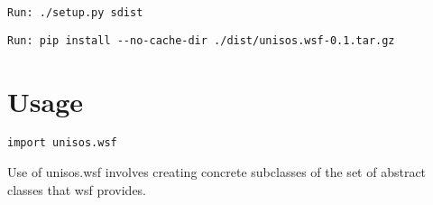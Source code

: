 \documentclass{article}
\begin{document}
\begin{verbatim}
Run: ./setup.py sdist
\end{verbatim}

\begin{verbatim}
Run: pip install --no-cache-dir ./dist/unisos.wsf-0.1.tar.gz
\end{verbatim}


\section{Usage}

\begin{verbatim}
import unisos.wsf
\end{verbatim}

Use of unisos.wsf involves creating concrete subclasses of the
set of abstract classes that wsf provides.


\begin{comment}
*  [[elisp:(org-cycle)][| ]]  *DBLK: main-end*                                       :: [[elisp:(beginning-of-buffer)][Top]] [[elisp:(delete-other-windows)][(1)]]  [[elisp:(org-cycle)][| ]]
\end{comment}
\end{document}
